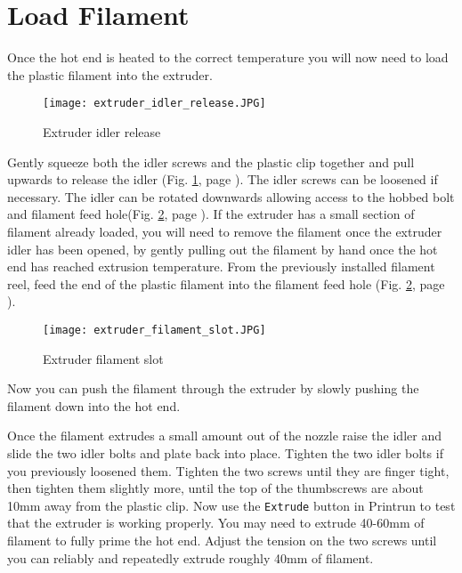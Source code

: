 \section{Load Filament}

Once the hot end is heated to the correct temperature you will now need to load the plastic filament into the extruder.
\begin{figure}[hbt]
\centering
\texttt{[image: extruder\_idler\_release.JPG]}
\caption{Extruder idler release}
\label{fig:extruder_idler_release}
\end{figure}
Gently squeeze both the idler screws and the plastic clip together and pull upwards to release the idler (Fig. \ref{fig:extruder_idler_release}, page \pageref{fig:extruder_idler_release}). The idler screws can be loosened if necessary. The idler can be rotated downwards allowing access to the hobbed bolt and filament feed hole(Fig. \ref{fig:extruder_filament_slot}, page \pageref{fig:extruder_filament_slot}). If the extruder has a small section of filament already loaded, you will need to remove the filament once the extruder idler has been opened, by gently pulling out the filament by hand once the hot end has reached extrusion temperature. From the previously installed filament reel, feed the end of the plastic filament into the filament feed hole
(Fig. \ref{fig:extruder_filament_slot}, page \pageref{fig:extruder_filament_slot}).
\begin{figure}[hbt]
\centering
\texttt{[image: extruder\_filament\_slot.JPG]}
\caption{Extruder filament slot}
\label{fig:extruder_filament_slot}
\end{figure}
Now you can push the filament through the extruder by slowly pushing the filament down into the hot end.

Once the filament extrudes a small amount out of the nozzle raise the idler and slide the two idler bolts and plate back into place. Tighten the two idler bolts if you previously loosened them. Tighten the two screws until they are finger tight, then tighten them slightly more, until the top of the thumbscrews are about 10mm away from the plastic clip. Now use the \texttt{Extrude} button in Printrun to test that the extruder is working properly. You may need to extrude 40-60mm of filament to fully prime the hot end. Adjust the tension on the two screws until you can reliably and repeatedly extrude roughly 40mm of filament.

